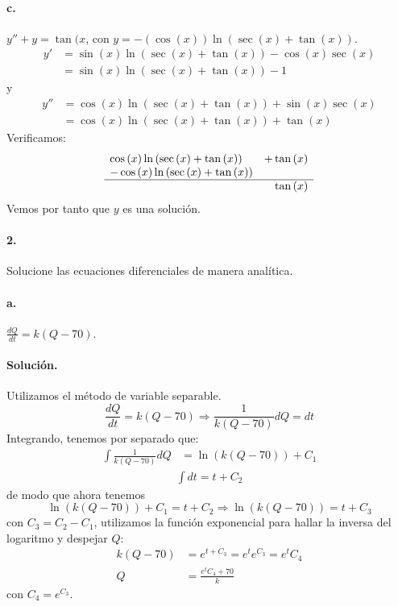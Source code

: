 \documentclass{article}
\begin{document}
\paragraph{c.} $y'' + y = \tan{(x}$, con $y = -(\cos{(x)}) \ln{(\sec{(x)} + \tan{(x)})}$.
\begin{align*}
	y' &= \sin{(x)} \ln{(\sec{(x)} + \tan{(x)})} - \cos{(x)} \sec{(x)}\\
	&= \sin{(x)} \ln{(\sec{(x)} + \tan{(x)})} - 1
\end{align*}
y
\begin{align*}
	y'' &= \cos{(x)} \ln{(\sec{(x)} + \tan{(x)})} + \sin{(x)}\sec{(x)}\\
	&= \cos{(x)} \ln{(\sec{(x)} + \tan{(x)})} + \tan{(x)}
\end{align*}
Verificamos:
\[
	\begin{array}{l l}
		  \cos{(x)}\ln{(\sec{(x)} + \tan{(x)})} &  + \tan{(x)}\\
		- \cos{(x)}\ln{(\sec{(x)} + \tan{(x)})} & \space\\
		\hline
		\multicolumn{2}{r}{\tan{(x)}}
	\end{array}
\]
Vemos por tanto que $y$ es una solución.
\paragraph{2.} Solucione las ecuaciones diferenciales de manera analítica.
\paragraph{a.} $\frac{dQ}{dt} = k(Q - 70)$.
\paragraph{Solución.} Utilizamos el método de variable separable.
$$\frac{dQ}{dt} = k(Q - 70) \Rightarrow \frac{1}{k(Q-70)} dQ = dt$$
Integrando, tenemos por separado que:
\begin{align*}
	\int \frac{1}{k(Q-70)} dQ &= \ln{(k(Q - 70))} + C_1
\end{align*}
\begin{align*}
	\int dt = t + C_2
\end{align*}
de modo que ahora tenemos
$$\ln{(k(Q - 70))} + C_1 = t + C_2 \Rightarrow \ln{(k(Q - 70))} = t + C_3$$
con $C_3 = C_2 - C_1 $, utilizamos la función exponencial para hallar la inversa del logaritmo y despejar $Q$:
\begin{align*}
	k(Q - 70) &= e^{t + C_3} = e^t e^{C_3} = e^t C_4\\
	Q &= \frac{e^t C_4 + 70}{k}
\end{align*}
con $C_4 = e^{C_3}$.
\end{document}

